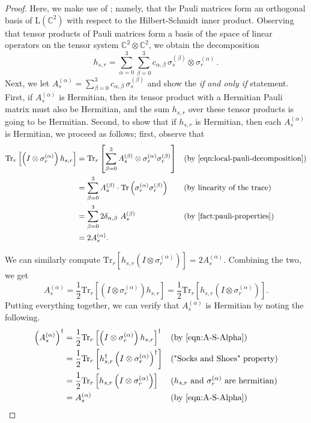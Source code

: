 \documentclass[a4paper,onecolumn,11pt]{quantumarticle}
\theoremstyle{plain}
\begin{document}
\begin{proof}
Here, we make use of ; namely, that the Pauli matrices form an orthogonal basis of $\mathrm{L}(\mathbb{C}^{2})$ with respect to the Hilbert-Schmidt inner product. Observing that tensor products of Pauli matrices form a basis 
of the space of linear operators on the tensor system $\mathbb{C}^{2} \otimes \mathbb{C}^{2}$, we obtain the decomposition
    \[ h_{s,r} = \sum_{\alpha=0}^{3} \sum_{\beta=0}^{3} c_{\alpha, \beta} \, \sigma_s^{(\beta)} \otimes \sigma_r^{(\alpha)} \, .\]
Next, we let $A^{(\alpha)}_s = \sum_{\beta=0}^{3} c_{\alpha, \beta} \, \sigma_s^{(\beta)}$ and show the \emph{if and only if} statement. First, if $A^{(\alpha)}_s$ is Hermitian, then its tensor product with a Hermitian Pauli matrix must also be Hermitian, and the sum $h_{s,r}$ over these tensor products is going to be Hermitian. Second, to show that if $h_{s,r}$ is Hermitian, then each $A^{(\alpha)}_s$ is Hermitian, we proceed as follows; first, observe that
\begin{align}
\mathrm{Tr}_{r}\left[\left(I \otimes \sigma_r^{(\alpha)} \right) h_{s,r} \right] &= \mathrm{Tr}_{r} \left[\sum\limits_{\beta = 0}^{3} A_s^{(\beta)} \otimes \sigma_r^{(\alpha)} \sigma_r^{(\beta)}\right] && \text{(by \Cref{eqn:local-pauli-decomposition})}\\
    &= \sum\limits_{\beta = 0}^{3} A_s^{(\beta)} \cdot \mathrm{Tr}\left(\sigma_r^{(\alpha)} \sigma_r^{(\beta)}\right) && \text{(by linearity of the trace)}\\
    &= \sum\limits_{\beta = 0}^{3} 2\delta_{\alpha, \beta}\ A_s^{(\beta)}&& (\text{by \Cref{fact:pauli-properties}})\\
    &= 2 A_s^{(\alpha)}.
\end{align}

\noindent We can similarly compute $\mathrm{Tr}_{r}\left[ h_{s,r} \left(I \otimes \sigma_r^{(\alpha)} \right)\right] = 2 A_s^{(\alpha)}$. Combining the two, we get
\begin{equation}\label{eqn:A-S-Alpha}
    A_s^{(\alpha)} = \frac{1}{2} \mathrm{Tr}_{r}\left[\left(I \otimes \sigma_r^{(\alpha)} \right) h_{s,r} \right] = \frac{1}{2} \mathrm{Tr}_{r}\left[ h_{s,r} \left(I \otimes \sigma_r^{(\alpha)} \right)\right].
\end{equation}
Putting everything together, we can verify that $A_s^{(\alpha)}$ is Hermitian by noting the following.
\begin{align}
\left(A_s^{(\alpha)}\right)^\dagger &= \frac{1}{2} \mathrm{Tr}_{r}\left[\left(I \otimes \sigma_r^{(\alpha)} \right) h_{s,r} \right]^\dagger && \text{(by \Cref{eqn:A-S-Alpha})}\\
    &= \frac{1}{2} \mathrm{Tr}_{r}\left[ h_{s,r}^\dagger \left(I \otimes \sigma_r^{(\alpha)} \right)^\dagger \right] && \text{("Socks and Shoes" property)} \\
    &= \frac{1}{2} \mathrm{Tr}_{r}\left[ h_{s,r} \left(I \otimes \sigma_r^{(\alpha)} \right) \right] && \text{($h_{s,r}$ and $\sigma_r^{(\alpha)}$ are hermitian)}\\
    &= A_s^{(\alpha)} && \text{(by \Cref{eqn:A-S-Alpha})}
\end{align}
\end{proof}
\end{document}
